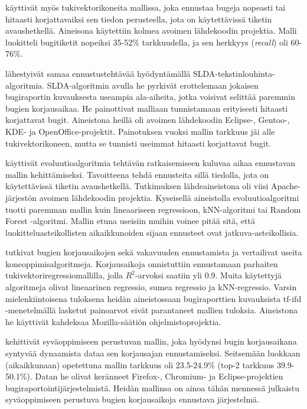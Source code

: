 \documentclass[utf8]{gradu3}
\begin{document}
\textcite{Ardimento-2017} käyttivät myös tukivektorikoneita mallissa, joka
ennustaa bugeja nopeasti tai hitaasti korjattavaiksi sen tiedon perusteella,
jota on käytettävissä tiketin avaushetkellä. Aineisona käytettiin kolmea avoimen
lähdekoodin projektia. Malli luokitteli bugitiketit nopeiksi 35-52\%
tarkkuudella, ja sen herkkyys (\textit{recall}) oli 60-76\%. 

\textcite{Ardimento-2016} lähestyivät samaa ennustustehtävää hyödyntämällä
SLDA-tekstinlouhinta-algoritmia. SLDA-algoritmin avulla he pyrkivät erottelemaan
jokaisen bugiraportin kuvauksesta useampia ala-aiheita, jotka voisivat selittää
paremmin bugien korjausaikaa. He painottivat malliaan tunnistamaan erityisesti
hitaasti korjattavat bugit. Aineistona heillä oli avoimen lähdekoodin Eclipse-,
Gentoo-, KDE- ja OpenOffice-projektit. Painotuksen vuoksi mallin tarkkuus jäi
alle tukivektorikoneen, mutta se tunnisti useimmat hitaasti korjattavat bugit.

\textcite{Al-Zubaidi-2017} käyttivät evoluutioalgoritmia tehtävän ratkaisemiseen
kuluvaa aikaa ennustavan mallin kehittämiseksi. Tavoitteena tehdä ennusteita
sillä tiedolla, jota on käytettävissä tiketin avaushetkellä. Tutkimuksen
lähdeaineistona oli viisi Apache-järjestön avoimen lähdekoodin projektia.
Kyseisellä aineistolla evoluutioalgoritmi tuotti paremman mallin kuin
lineaariseen regressioon, kNN-algoritmi tai Random Forest -algoritmi. Mallin
etuna useisiin muihin voinee pitää sitä, että luokitteluasteikollisten
aikaikkunoiden sijaan ennusteet ovat jatkuva-asteikollisia.

\textcite{Sharma-2019} tutkivat bugien korjausaikojen sekä vakavuuden
ennustamista ja vertailivat useita koneoppimisalgoritmeja. Korjausaikoja
onnistuttiin ennustamaan parhaiten tukivektoriregressiomallilla, jolla
\(R^2\)-arvoksi saatiin yli 0.9. Muita käytettyjä algoritmeja olivat lineaarinen
regressio, sumea regressio ja kNN-regressio. Varsin mielenkiintoisena tuloksena
heidän aineistossaan bugiraporttien kuvauksista tf-ifd -menetelmällä lasketut
painoarvot eivät parantaneet mallien tuloksia. Aineistona he käyttivät kahdeksaa
Mozilla-säätiön ohjelmistoprojektia.

\textcite{Lee-2020} kehittivät syväoppimiseen perustuvan mallin, joka hyödynsi
bugin korjausaikana syntyvää dynaamista dataa sen korjausajan ennustamiseksi.
Seitsemään luokkaan (aikaikkunaan) opetettuna  mallin tarkkuus oli 23.5-24.9\%
(top-2 tarkkuus 39.9-50.1\%). Datan he olivat keränneet Firefox-, Chromium- ja
Eclipse-projektien bugiraportointijärjestelmistä. Heidän mallinsa on ainoa tähän
mennessä julkaistu syväoppimiseen perustuva bugien korjausaikoja ennustava
järjestelmä.
\end{document}
